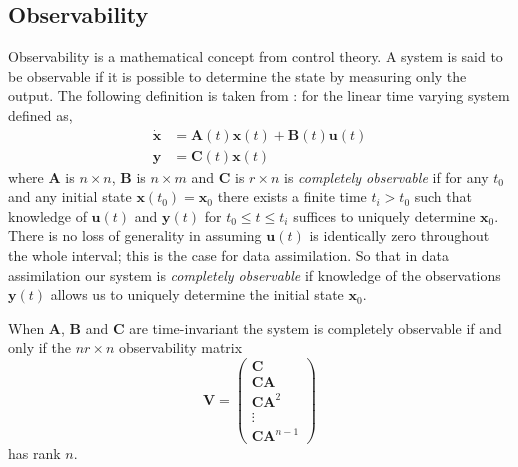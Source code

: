 \subsection{Observability}

Observability is a mathematical concept from control theory. A system is said to be observable if it is possible to determine the state by measuring only the output. The following definition is taken from \citet{barnett1985introduction}: for the linear time varying system defined as,
\begin{align}
\dot{\textbf{x}} &= \textbf{A}(t)\textbf{x}(t) +\textbf{B}(t)\textbf{u}(t) \\
\textbf{y} &= \textbf{C}(t)\textbf{x}(t)
\end{align}
where $\textbf{A}$ is $n \times n$, $\textbf{B}$ is $n \times m$ and $\textbf{C}$ is $r \times n$ is \textit{completely observable} if for any $t_0$ and any initial state $\textbf{x}(t_0) = \textbf{x}_0$ there exists a finite time $t_i > t_0$ such that knowledge of $\textbf{u}(t)$ and $\textbf{y}(t)$ for $t_0 \leq t \leq t_i$ suffices to uniquely determine $\textbf{x}_0$. There is no loss of generality in assuming $\textbf{u}(t)$ is identically zero throughout the whole interval; this is the case for data assimilation. So that in data assimilation our system is \textit{completely observable} if knowledge of the observations $\textbf{y}(t)$ allows us to uniquely determine the initial state $\textbf{x}_0$.

\begin{theorem} \label{chap5:thm:observable}
When $\textbf{A}$, $\textbf{B}$ and $\textbf{C}$ are time-invariant the system is completely observable if and only if the $nr \times n$ observability matrix
\begin{equation}
\mathbf{V}=
\begin{pmatrix}
\mathbf{C} \\
\mathbf{C}\mathbf{A}\\
\mathbf{C}\mathbf{A}^{2}\\
\vdots \\
\mathbf{C}\mathbf{A}^{n-1}
\end{pmatrix}
\end{equation}
has rank $n$.
\end{theorem}

